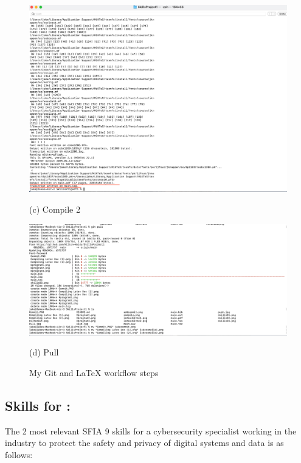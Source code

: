 \documentclass[a4paper, 11pt]{report}
\begin{document}
\begin{figure}[htbp]
\begin{minipage}[t]{0.45\textwidth}
\centering
\includegraphics[width=\linewidth]{jakecompile2.png}
\caption*{(c) Compile 2}
\end{minipage}
\hfill
\begin{minipage}[t]{0.45\textwidth}
\centering
\includegraphics[width=\linewidth]{jakepull.png}
\caption*{(d) Pull}
\end{minipage}

\caption{My Git and LaTeX workflow steps}
\end{figure}
\clearpage

\subsection{Skills for \majD: \studD}

The 2 most relevant SFIA 9 skills \cite{sfia} for a cybersecurity specialist working in the industry to protect the safety and privacy of digital systems and data is as follows:
\end{document}
